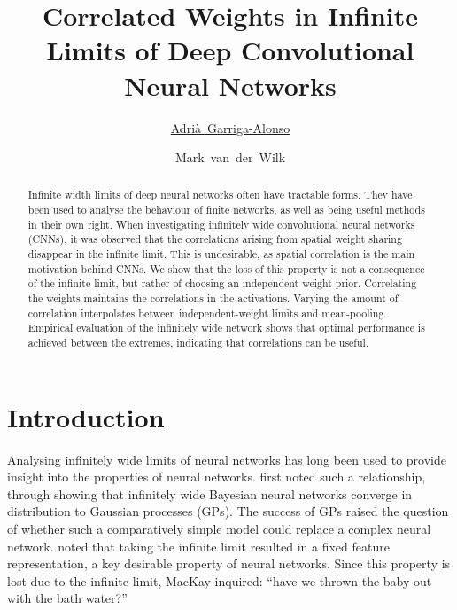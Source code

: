 \documentclass[accepted]{uai2021} %
\title{Correlated Weights in Infinite Limits of Deep Convolutional Neural Networks}
\author[1]{\href{mailto:Adrià Garriga-Alonso <ag919@cam.ac.uk>?Subject=Your UAI 2021 paper}{Adrià~Garriga-Alonso}{}}
\author[2]{Mark~van~der~Wilk}
\affil[1]{%
    Department of Engineering\\
    University of Cambridge\\
    UK
}
\affil[2]{%
    Department of Computer Science\\
    Imperial College London\\
    UK
}
\newcommand{\0}{\boldsymbol{0}}
\newcommand{\1}{\boldsymbol{1}}
\begin{document}
\maketitle

\begin{abstract}
Infinite width limits of deep neural networks often have tractable forms. They have been used to analyse the behaviour of finite networks, as well as being useful methods in their own right. When investigating infinitely wide convolutional neural networks (CNNs), it was observed that the correlations arising from spatial weight sharing disappear in the infinite limit.
This is undesirable, as spatial correlation is the main motivation behind CNNs. We show that the loss of this property is not a consequence of the infinite limit, but rather of choosing an independent weight prior. Correlating the weights maintains the correlations in the activations. 
Varying the amount of correlation interpolates between independent-weight limits and mean-pooling. Empirical evaluation of the infinitely wide network shows that optimal performance is achieved between the extremes, indicating that correlations can be useful.
\end{abstract}

\section{Introduction}
Analysing infinitely wide limits of neural networks has long been used to provide insight into the properties of neural networks.
\citet{neal1996bayesian} first noted such a relationship, through showing that infinitely wide Bayesian neural networks converge in distribution to Gaussian processes (GPs).
The success of GPs raised the question of whether such a comparatively simple model could replace a complex neural network. \citet{mackay1998introgp} noted that taking the infinite limit resulted in a fixed feature representation, a key desirable property of neural networks. Since this property is lost due to the infinite limit, MacKay inquired: ``have we thrown the baby out with the bath water?''
\end{document}
